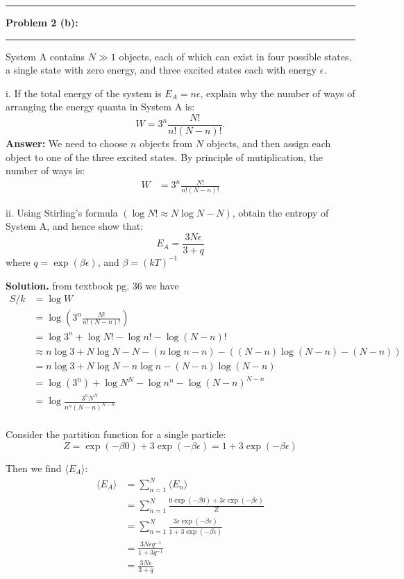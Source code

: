 \documentclass[11pt]{article}
\newcommand\question[2]{\vspace{.25in}\hrule\textbf{#1: #2}\vspace{.5em}\hrule\vspace{.10in}}
\begin{document}
\question{Problem 2 (b)}{}
System A contains $N \gg 1$ objects, each of which can exist in four
possible states, a single state with zero energy, and three excited states each with energy $\epsilon$.

i. If the total energy of the system is $E_A = n\epsilon$, explain why the number of ways of arranging the energy quanta in System A is:
\[W = 3^n \frac{N!}{n!(N-n)!}.\]
\textbf{Answer:} We need to choose $n$ objects from $N$ objects, and then assign each object to one of the three excited states. By principle of mutiplication, the number of ways is:
\begin{align*}
    W &= 3^n \frac{N!}{n!(N-n)!}
\end{align*}

ii. Using Stirling's formula $(\log N! \approx N\log N - N)$, obtain the entropy of System A, and hence show that:
\[E_A = \frac{3N\epsilon}{3 + q}\]
where $q = \exp(\beta\epsilon)$, and $\beta = (kT)^{-1}$

\textbf{Solution.} from textbook pg. 36 we have
\begin{align*}
    S/k &= \log W \\
      &= \log \left(3^n \frac{N!}{n!(N-n)!}\right) \\
      &= \log 3^n + \log N! - \log n! - \log (N-n)! \\
      &\approx n\log 3 + N\log N - N - (n\log n - n) - ((N-n)\log (N-n) - (N- n))\\
      &=n\log 3 + N\log N - n\log n - (N-n)\log (N-n) \\
      &= \log (3^n) + \log N^N - \log n^n - \log (N-n)^{N-n} \\
      &= \log \frac{3^nN^N}{n^n(N-n)^{N-n}} \\
\end{align*}

Consider the partition function for a single particle:
\[Z = \exp(-\beta 0) + 3\exp(-\beta\epsilon) = 1 + 3\exp(-\beta\epsilon)\]

Then we find $\langle E_A \rangle$:
\begin{align*}
    \langle E_A \rangle &= \sum_{n=1}^{N} \langle E_n \rangle\\
                        &= \sum_{n=1}^{N} \frac{0\exp(-\beta 0) + 3\epsilon\exp(-\beta\epsilon)}{Z}\\
                        &= \sum_{n=1}^{N} \frac{3\epsilon\exp(-\beta\epsilon)}{1 + 3\exp(-\beta\epsilon)}\\
                        &= \frac{3N\epsilon q^{-1}}{1 + 3q^{-1}}\\
                        &= \frac{3N\epsilon}{3 + q}\\
\end{align*}
\end{document}
